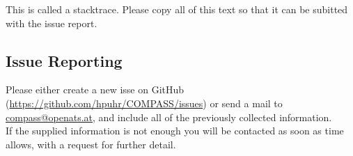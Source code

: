This is called a stacktrace. Please copy all of this text so that it can be subitted with the issue report.


\subsection{Issue Reporting}

Please either create a new isse on GitHub (\url{https://github.com/hpuhr/COMPASS/issues}) or send a mail to \href{mailto:compass@openats.at}{compass@openats.at}, and include all of the previously collected information. \\

If the supplied information is not enough you will be contacted as soon as time allows, with a request for further detail.


